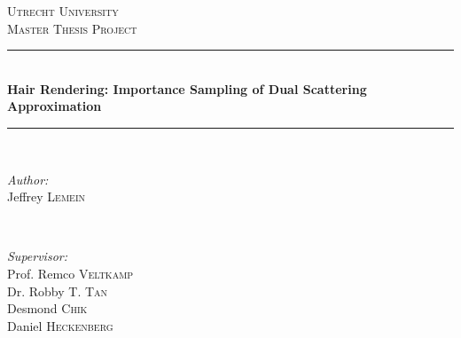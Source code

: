 \documentclass[11pt,a4paper]{report}
\begin{document}
\begin{titlepage}

\newcommand{\HRule}{\rule{\linewidth}{0.5mm}} %

\center %
 

\textsc{\LARGE Utrecht University}\\[1.5cm] %
\textsc{\Large Master Thesis Project}\\[0.5cm] %


\HRule \\[0.4cm]
{ \huge \bfseries Hair Rendering: Importance Sampling of Dual Scattering Approximation}\\[0.4cm] %
\HRule \\[1.5cm]
 

\begin{minipage}{0.4\textwidth}
\begin{flushleft} \large
\emph{Author:}\\
Jeffrey \textsc{Lemein}%
\end{flushleft}
\end{minipage}
~
\begin{minipage}{0.4\textwidth}
\begin{flushright} \large
\emph{Supervisor:} \\
Prof. Remco \textsc{Veltkamp} \\ %
Dr. Robby T. \textsc{Tan} \\ %
Desmond \textsc{Chik} \\ %
Daniel \textsc{Heckenberg}  %
\end{flushright}
\end{minipage}\\[4cm]


\end{titlepage}
\end{document}
